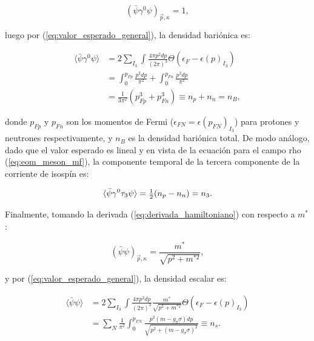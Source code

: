 \begin{equation*}
	(\bar{\psi} \gamma^0 \psi)_{\Vec{p},\kappa} = 1,
\end{equation*}

luego por (\ref{eq:valor_esperado_general}), la densidad bariónica es:

\begin{equation}
	\begin{aligned}
		\langle \bar{\psi} \gamma^0 \psi \rangle &= 2\sum_{I_3}\int \frac{4 \pi p^2 dp}{(2\pi)^3} \Theta(\epsilon_F - \epsilon(p)_{I_3}) \\
												 &= \int_0^{p_{Fp}} \frac{p^2 dp}{\pi^2} + \int_0^{p_{Fn}} \frac{p^2 dp}{\pi^2} \\
												 &= \frac{1}{3\pi^2}(p_{Fp}^3 + p_{Fn}^3) \equiv n_p + n_n = n_B,
		\label{eq:densidad_barionica}
	\end{aligned}
\end{equation}

donde $p_{Fp}$ y $p_{Fn}$ son los momentos de Fermi ($\epsilon_{FN} = \epsilon(p_{FN})_{I_3}$) para protones y neutrones respectivamente, y $n_B$ es la densidad bariónica total. De modo análogo, dado que el valor esperado es lineal y en vista de la ecuación para el campo rho (\ref{eq:eom_meson_mf}), la componente temporal de la tercera componente de la corriente de isospín es:

\begin{equation}
		\langle \bar{\psi} \gamma^0 \tau_3 \psi \rangle = \tfrac{1}{2} (n_p - n_n) = n_3.
		\label{eq:densidad_isospin}
\end{equation}

Finalmente, tomando la derivada (\ref{eq:derivada_hamiltoniano}) con respecto a $m^*$:

\begin{equation*}
	(\bar{\psi} \psi)_{\Vec{p},\kappa} = \frac{m^*}{\sqrt{p^2 + m^{*2}}},
\end{equation*}

y por (\ref{eq:valor_esperado_general}), la densidad escalar es:

\begin{equation}
	\begin{aligned}
		\langle \bar{\psi} \psi \rangle &= 2\sum_{I_3}\int \frac{4 \pi p^2 dp}{(2\pi)^3} \frac{m^*}{\sqrt{p^2 + m^{*2}}} \Theta(\epsilon_F - \epsilon(p)_{I_3}) \\
										&= \sum_N \frac{1}{\pi^2}\int_0^{p_{FN}} \frac{p^2 (m-g_\sigma\sigma) dp}{\sqrt{p^2 + (m-g_\sigma\sigma)^{2}}} \equiv n_s. \\
		\label{eq:densidad_escalar}
	\end{aligned}
\end{equation}

